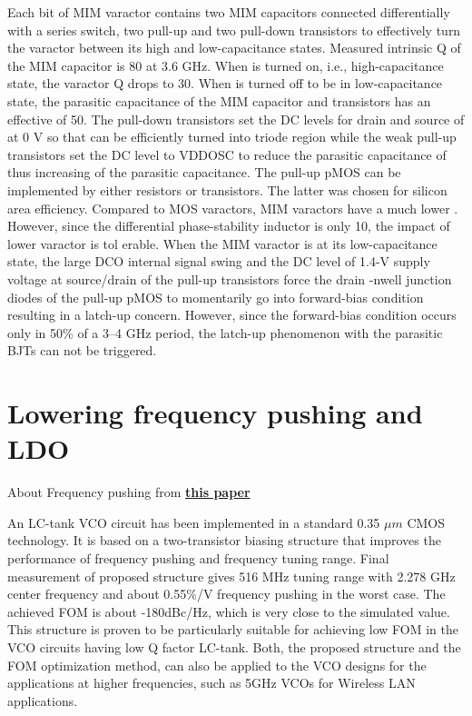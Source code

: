 \documentclass{article}
\begin{document}
\begin{info} %
Each bit of MIM varactor contains two MIM capacitors connected differentially with a series switch, two pull-up and two pull-down transistors to effectively turn the varactor between its high and low-capacitance states. Measured intrinsic Q of the MIM capacitor is 80 at 3.6 GHz. When is turned on, i.e., high-capacitance state, the varactor Q drops to 30. When is turned off to be in low-capacitance state, the parasitic capacitance of the MIM capacitor and transistors has an effective of 50. The pull-down transistors set the DC levels for drain and source of at 0 V so that
can be efficiently turned into triode region while the weak pull-up transistors set the DC level to VDDOSC to reduce the parasitic capacitance of thus increasing of the parasitic capacitance. The pull-up pMOS can be implemented by either resistors or transistors. The latter was chosen for silicon area efficiency. Compared to MOS varactors, MIM varactors have a much lower . However, since the differential phase-stability inductor is only 10, the impact of lower varactor is tol erable. When the MIM varactor is at its low-capacitance state, the large DCO internal signal swing and the DC level of 1.4-V supply voltage at source/drain of the pull-up transistors force the drain -nwell junction diodes of the pull-up pMOS to momentarily go into forward-bias condition resulting in a latch-up concern. However, since the forward-bias condition occurs only in 50\% of a 3–4 GHz period, the latch-up phenomenon with the parasitic BJTs can not be triggered.
\end{info}

\section{Lowering frequency pushing and LDO}

About Frequency pushing from \href{https://www.atlantis-press.com/article/6376.pdf}{\textbf{this paper}}

\begin{info} %
An LC-tank VCO circuit has been implemented in a standard 0.35 $\mu m$ CMOS technology. It is based on a two-transistor biasing structure that improves the performance of frequency pushing and frequency tuning range. Final measurement of proposed structure gives 516 MHz tuning range with 2.278 GHz center frequency and about 0.55$\%$/V frequency pushing in the worst case. The achieved FOM is about -180dBc/Hz, which is very close to the simulated value. This structure is proven to be particularly suitable for achieving low FOM in the VCO circuits having low Q factor LC-tank. Both, the proposed structure and the FOM optimization method, can also be applied to the VCO designs for the applications at higher frequencies, such as 5GHz VCOs for Wireless LAN applications.
\end{info}
\end{document}
